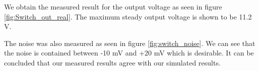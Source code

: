 We obtain the measured result for the output voltage as seen in figure \ref{fig:Switch_out_real}. The maximum steady output voltage is shown to be 11.2 V.

The noise was also measured as seen in figure \ref{fig:switch_noise}. We can see that the noise is contained between -10 mV and +20 mV which is desirable. 
It can be concluded that our measured results agree with our simulated results.







